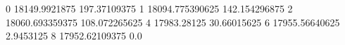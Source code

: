 0 18149.9921875 197.37109375
1 18094.775390625 142.154296875
2 18060.693359375 108.072265625
4 17983.28125 30.66015625
6 17955.56640625 2.9453125
8 17952.62109375 0.0
